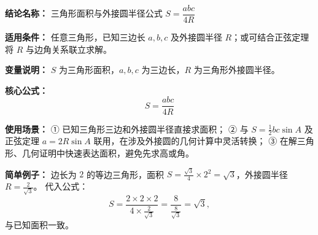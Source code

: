 \textbf{结论名称：} 三角形面积与外接圆半径公式 \( S=\dfrac{abc}{4R} \)

\textbf{适用条件：} 任意三角形，已知三边长 \(a,b,c\) 及外接圆半径 \(R\)；或可结合正弦定理将 \(R\) 与边角关系联立求解。

\textbf{变量说明：} \(S\) 为三角形面积，\(a,b,c\) 为三边长，\(R\) 为三角形外接圆半径。

\textbf{核心公式：} 
\[
\boxed{S=\frac{abc}{4R}}
\]

\textbf{使用场景：}
① 已知三角形三边和外接圆半径直接求面积；
② 与 \(S=\frac{1}{2}bc\sin A\) 及正弦定理 \(a=2R\sin A\) 联用，在涉及外接圆的几何计算中灵活转换；
③ 在解三角形、几何证明中快速表达面积，避免先求高或角。

\textbf{简单例子：}
边长为 \(2\) 的等边三角形，面积 \(S=\frac{\sqrt{3}}{4}\times 2^{2}=\sqrt{3}\)，外接圆半径 \(R=\frac{2}{\sqrt{3}}\)。
代入公式：
\[
S=\frac{2\times 2\times 2}{4\times\frac{2}{\sqrt{3}}}
  =\frac{8}{\frac{8}{\sqrt{3}}}=\sqrt{3},
\]
与已知面积一致。
